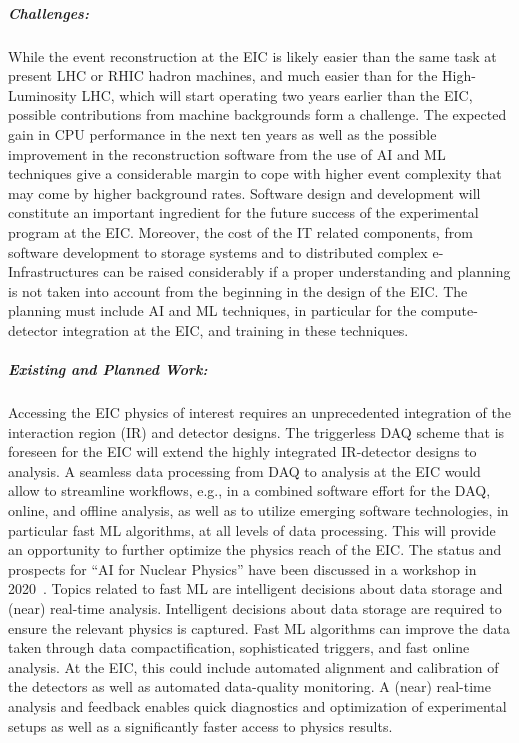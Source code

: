 \subparagraph*{Challenges:}
        While the event reconstruction at the EIC is likely easier than the same task at present LHC or RHIC hadron machines, and much easier than for the High-Luminosity LHC, which will start operating two years earlier than the EIC, possible contributions from machine backgrounds form a challenge. The expected gain in CPU performance in the next ten years as well as the possible improvement in the reconstruction software from the use of AI and ML techniques give a considerable margin to cope with higher event complexity that may come by higher background rates. Software design and development will constitute an important ingredient for the future success of the experimental program at the EIC. 
        Moreover, the cost of the IT related components, from software development to storage systems and to distributed complex e-Infrastructures can be raised considerably if a proper understanding and planning is not taken into account from the beginning in the design of the EIC. 
        The planning must include AI and ML techniques, in particular for the compute-detector integration at the EIC, and training in these techniques. 
        
\subparagraph*{Existing and Planned Work:}
        
         Accessing the EIC physics of interest requires an unprecedented integration of the interaction region (IR) and detector designs. 
         The triggerless DAQ scheme that is foreseen for the EIC will extend the highly integrated IR-detector designs to analysis. A seamless data processing from DAQ to analysis at the EIC would allow to streamline workflows, e.g., in a combined software effort for the DAQ, online, and offline analysis, as well as to utilize emerging software technologies, in particular fast ML algorithms, at all levels of data processing. 
         This will provide an opportunity to further optimize the physics reach of the EIC. 
         The status and prospects for ``AI for Nuclear Physics'' have been discussed in a workshop in 2020~\cite{Bedaque:2021bja}. 
         Topics related to fast ML are intelligent decisions about data storage and (near) real-time analysis. 
         Intelligent decisions about data storage are required to ensure the relevant physics is captured. 
         Fast ML algorithms can improve the data taken through data compactification, sophisticated triggers, and fast online analysis. 
         At the EIC, this could include automated alignment and calibration of the detectors as well as automated data-quality monitoring. A (near) real-time analysis and feedback enables quick diagnostics and optimization of experimental setups as well as a significantly faster access to physics results. 
         
